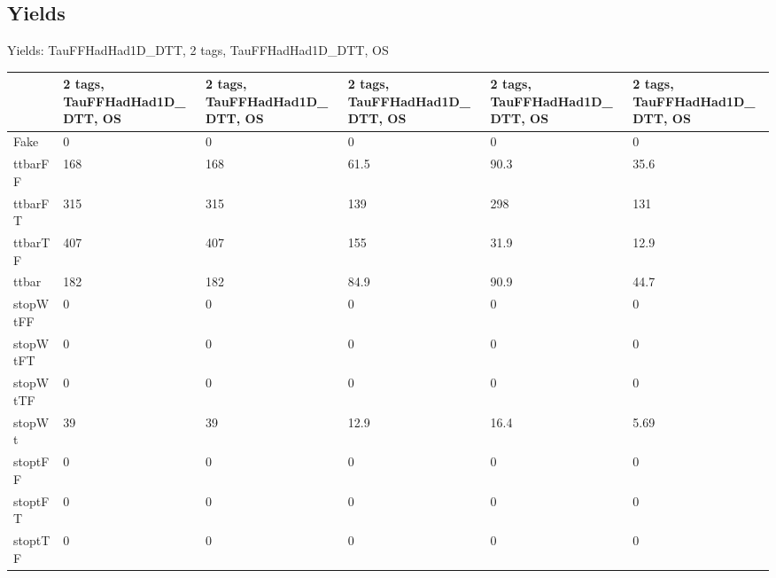 
\subsection{Yields}

\begin{frame}{Yields: TauFFHadHad1D\_DTT, 2 tags, TauFFHadHad1D\_DTT, OS}
\begin{center}
  \begin{tabular}{l| >{\centering\let\newline\\\arraybackslash\hspace{0pt}}m{1.4cm}| >{\centering\let\newline\\\arraybackslash\hspace{0pt}}m{1.4cm}| >{\centering\let\newline\\\arraybackslash\hspace{0pt}}m{1.4cm}| >{\centering\let\newline\\\arraybackslash\hspace{0pt}}m{1.4cm}| >{\centering\let\newline\\\arraybackslash\hspace{0pt}}m{1.4cm}}
    & 2 tags, TauFFHadHad1D\_DTT, OS & 2 tags, TauFFHadHad1D\_DTT, OS & 2 tags, TauFFHadHad1D\_DTT, OS & 2 tags, TauFFHadHad1D\_DTT, OS & 2 tags, TauFFHadHad1D\_DTT, OS \\
 \hline \hline
    Fake& 0 & 0 & 0 & 0 & 0 \\
 \hline
    ttbarFF& 168 & 168 & 61.5 & 90.3 & 35.6 \\
 \hline
    ttbarFT& 315 & 315 & 139 & 298 & 131 \\
 \hline
    ttbarTF& 407 & 407 & 155 & 31.9 & 12.9 \\
 \hline
    ttbar& 182 & 182 & 84.9 & 90.9 & 44.7 \\
 \hline
    stopWtFF& 0 & 0 & 0 & 0 & 0 \\
 \hline
    stopWtFT& 0 & 0 & 0 & 0 & 0 \\
 \hline
    stopWtTF& 0 & 0 & 0 & 0 & 0 \\
 \hline
    stopWt& 39 & 39 & 12.9 & 16.4 & 5.69 \\
 \hline
    stoptFF& 0 & 0 & 0 & 0 & 0 \\
 \hline
    stoptFT& 0 & 0 & 0 & 0 & 0 \\
 \hline
    stoptTF& 0 & 0 & 0 & 0 & 0 \\

\end{tabular}
\end{center}
\end{frame}
